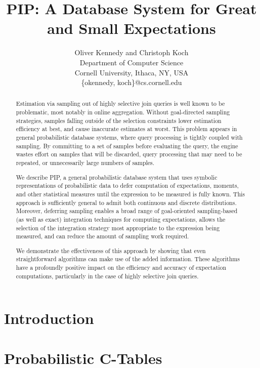 \documentclass[10pt,conference,letterpaper]{IEEEtran}
\title{PIP: A Database System for Great and Small Expectations}
\author{Oliver Kennedy and Christoph Koch\\
Department of Computer Science \\
Cornell University, Ithaca, NY, USA\\
\{okennedy, koch\}@cs.cornell.edu}
\date{}
\begin{document}
\maketitle



\begin{abstract}
Estimation via sampling out of highly selective join queries is well known to be problematic, most notably in online aggregation.  Without goal-directed sampling strategies, samples falling outside of the selection constraints lower estimation efficiency at best, and cause inaccurate estimates at worst.  This problem appears in general probabilistic database systems, where query processing is tightly coupled with sampling.  By committing to a set of samples before evaluating the query, the engine wastes effort on samples that will be discarded, query processing that may need to be repeated, or unnecessarily large numbers of samples.  

We describe PIP, a general probabilistic database system that uses symbolic representations of probabilistic data to defer computation of expectations, moments, and other statistical measures until the expression to be measured is fully known.  This approach is sufficiently general to admit both continuous and discrete distributions.  Moreover, deferring sampling enables a broad range of goal-oriented sampling-based (as well as exact) integration techniques for computing expectations, allows the selection of the integration strategy most appropriate to the expression being measured, and can reduce the amount of sampling work required.  

We demonstrate the effectiveness of this approach by showing that even straightforward algorithms can make use of the added information.  These algorithms have a profoundly positive impact on the efficiency and accuracy of expectation computations, particularly in the case of highly selective join queries.
\end{abstract}



\section{Introduction}
\label{sec:introduction}


\section{Probabilistic C-Tables}
\label{sec:background}

\end{document}
